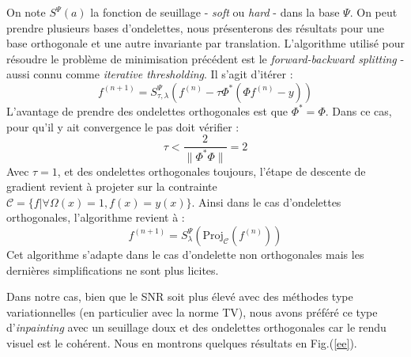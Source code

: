 On note $S^{\Psi}(a)$ la fonction de seuillage - \emph{soft} ou \emph{hard} - dans la base $\Psi$. On peut prendre plusieurs bases d'ondelettes, nous présenterons des résultats pour une base orthogonale et une autre invariante par translation. L'algorithme utilisé pour résoudre le problème de minimisation précédent est le \emph{forward-backward splitting} - aussi connu comme \emph{iterative thresholding}. Il s'agit d'itérer : 
\begin{equation}
f^{(n+1)} = S^{\Psi}_{\tau,\lambda}(f^{(n)} - \tau \Phi^*(\Phi f^{(n)} - y) )
\end{equation}
L'avantage de prendre des ondelettes orthogonales est que $\Phi^* = \Phi$. Dans ce cas, pour qu'il y ait convergence le pas doit vérifier :
\begin{equation}
\tau < \frac{2}{\| \Phi^* \Phi \|} = 2
\end{equation}
Avec $\tau = 1$, et des ondelettes orthogonales toujours, l'étape de descente de gradient revient à projeter sur la contrainte $\mathcal{C} = \{f | \forall \Omega(x) = 1, f(x) = y(x) \}$. Ainsi dans le cas d'ondelettes orthogonales, l'algorithme revient à :
\begin{equation}
f^{(n+1)} = S_{\lambda}^{\Psi} (\text{Proj}_{\mathcal{C}} (f^{(n)}))
\end{equation}
Cet algorithme s'adapte dans le cas d'ondelette non orthogonales mais les dernières simplifications ne sont plus licites. 

Dans notre cas, bien que le SNR soit plus élevé avec des méthodes type variationnelles (en particulier avec la norme TV), nous avons préféré ce type d'\emph{inpainting} avec un seuillage doux et des ondelettes orthogonales car le rendu visuel est le cohérent. Nous en montrons quelques résultats en Fig.(\ref{ee}).

